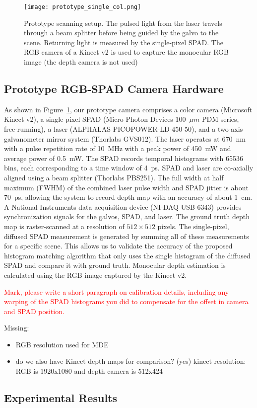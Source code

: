 \begin{figure}[H]
  \texttt{[image: prototype\_single\_col.png]}
  \caption{Prototype scanning setup. The pulsed light from the laser travels
    through a beam splitter before being guided by the galvo to the scene.
    Returning light is measured by the single-pixel SPAD. The RGB camera of a
    Kinect v2 is used to capture the monocular RGB image (the depth camera is
    not used)}
  \label{fig:prototype}
\end{figure}

\subsection{Prototype RGB-SPAD Camera Hardware}


As shown in Figure~\ref{fig:prototype}, our prototype camera comprises a color camera (Microsoft Kinect v2), a single-pixel SPAD (Micro Photon Devices 100~$\mu m$ PDM series, free-running), a laser (ALPHALAS PICOPOWER-LD-450-50), and a two-axis galvanometer mirror system (Thorlabs GVS012). The laser operates at 670~nm with a pulse repetition rate of 10~MHz with a peak power of 450~mW and average power of 0.5~mW. The SPAD records temporal histograms with 65536 bins, each corresponding to a time window of 4~ps. SPAD and laser are co-axially aligned using a beam splitter (Thorlabs PBS251). The full width at half maximum (FWHM) of the combined laser pulse width and SPAD jitter is about 70~ps, allowing the system to record depth map with an accuracy of about 1~cm. A National Instruments data acquisition device (NI-DAQ USB-6343) provides synchronization signals for the galvos, SPAD, and laser. The ground truth depth map is raster-scanned at a resolution of $512 \times 512$ pixels. The single-pixel, diffused SPAD measurement is generated by summing all of these measurements for a specific scene. This allows us to validate the accuracy of the proposed histogram matching algorithm that only uses the single histogram of the diffused SPAD and compare it with ground truth. Monocular depth estimation is calculated using the RGB image captured by the Kinect v2.

\textcolor{red}{Mark, please write a short paragraph on calibration details, including any warping of the SPAD histograms you did to compensate for the offset in camera and SPAD position.}

Missing:
%
\begin{itemize}
\item RGB resolution used for MDE
\item do we also have Kinect depth maps for comparison? (yes) kinect resolution: RGB is 1920x1080 and depth camera is 512x424
\end{itemize}

\subsection{Experimental Results}

